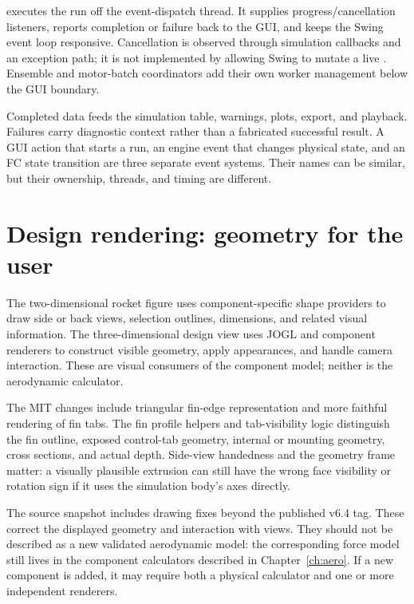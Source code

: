  executes the run off the event-dispatch thread. It supplies progress/cancellation listeners, reports completion or failure back to the GUI, and keeps the Swing event loop responsive. Cancellation is observed through simulation callbacks and an exception path; it is not implemented by allowing Swing to mutate a live . Ensemble and motor-batch coordinators add their own worker management below the GUI boundary.

Completed data feeds the simulation table, warnings, plots, export, and playback. Failures carry diagnostic context rather than a fabricated successful result. A GUI action that starts a run, an engine event that changes physical state, and an FC state transition are three separate event systems. Their names can be similar, but their ownership, threads, and timing are different.


\section{Design rendering: geometry for the user}
The two-dimensional rocket figure uses component-specific shape providers to draw side or back views, selection outlines, dimensions, and related visual information. The three-dimensional design view uses JOGL and component renderers to construct visible geometry, apply appearances, and handle camera interaction. These are visual consumers of the component model; neither is the aerodynamic calculator.

The MIT changes include triangular fin-edge representation and more faithful rendering of fin tabs. The fin profile helpers and tab-visibility logic distinguish the fin outline, exposed control-tab geometry, internal or mounting geometry, cross sections, and actual depth. Side-view handedness and the geometry frame matter: a visually plausible extrusion can still have the wrong face visibility or rotation sign if it uses the simulation body's axes directly.

The source snapshot includes drawing fixes beyond the published v6.4 tag. These correct the displayed geometry and interaction with views. They should not be described as a new validated aerodynamic model: the corresponding force model still lives in the component calculators described in Chapter~\ref{ch:aero}. If a new component is added, it may require both a physical calculator and one or more independent renderers.

